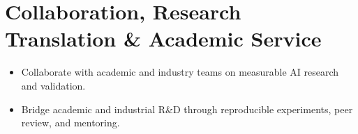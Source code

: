 \documentclass[9pt,letterpaper]{extarticle}
\begin{document}
\section{Collaboration, Research Translation \& Academic Service}
\begin{itemize}
\item Collaborate with academic and industry teams on measurable AI research and validation.
\item Bridge academic and industrial R\&D through reproducible experiments, peer review, and mentoring.
\end{itemize}
\end{document}
